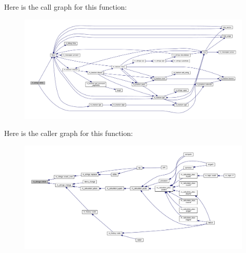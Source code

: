 Here is the call graph for this function\+:
\nopagebreak
\begin{figure}[H]
\begin{center}
\leavevmode
\includegraphics[width=350pt]{namespacem__strings_a9a923829f31ea70ecada6d214536a704_cgraph}
\end{center}
\end{figure}
Here is the caller graph for this function\+:
\nopagebreak
\begin{figure}[H]
\begin{center}
\leavevmode
\includegraphics[width=350pt]{namespacem__strings_a9a923829f31ea70ecada6d214536a704_icgraph}
\end{center}
\end{figure}
\mbox{\label{namespacem__strings_ab84a4b7c2be211433c2d1b435a87fa32}} 
